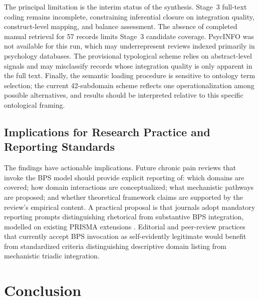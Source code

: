 \documentclass[11pt]{article}
\begin{document}
The principal limitation is the interim status of the synthesis. Stage~3 full-text coding remains incomplete, constraining inferential closure on integration quality, construct-level mapping, and balance assessment. The absence of completed manual retrieval for 57 records limits Stage~3 candidate coverage. PsycINFO was not available for this run, which may underrepresent reviews indexed primarily in psychology databases. The provisional typological scheme relies on abstract-level signals and may misclassify records whose integration quality is only apparent in the full text. Finally, the semantic loading procedure is sensitive to ontology term selection; the current 42-subdomain scheme reflects one operationalization among possible alternatives, and results should be interpreted relative to this specific ontological framing.



\subsection{Implications for Research Practice and Reporting Standards}

The findings have actionable implications. Future chronic pain reviews that invoke the BPS model should provide explicit reporting of: which domains are covered; how domain interactions are conceptualized; what mechanistic pathways are proposed; and whether theoretical framework claims are supported by the review's empirical content. A practical proposal is that journals adopt mandatory reporting prompts distinguishing rhetorical from substantive BPS integration, modelled on existing PRISMA extensions \citep{page2021}. Editorial and peer-review practices that currently accept BPS invocation as self-evidently legitimate would benefit from standardized criteria distinguishing descriptive domain listing from mechanistic triadic integration.

\section{Conclusion}
\label{sec:conclusion}
\end{document}
